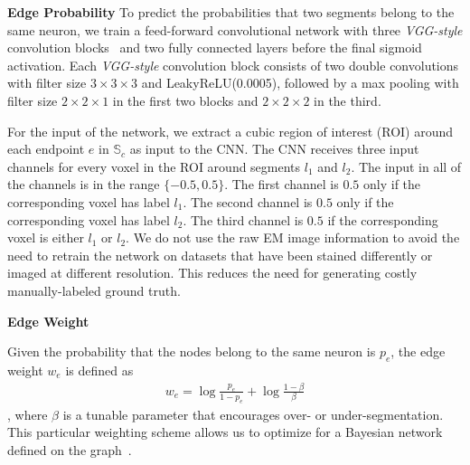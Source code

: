 \noindent\textbf{Edge Probability}
To predict the probabilities that two segments belong to the same neuron, we train a feed-forward convolutional network with three \textit{VGG-style} convolution blocks~\cite{chatfield2014return} and two fully connected layers before the final sigmoid activation. 
Each \textit{VGG-style} convolution block consists of two double convolutions with filter size $3\times3\times3$ and LeakyReLU(0.0005), followed by a max pooling with filter size $2\times2\times1$ in the first two blocks and $2\times2\times2$ in the third. 

For the input of the network, we extract a cubic region of interest (ROI) around each endpoint $e$ in $\mathbb{S}_c$ as input to the CNN. 
The CNN receives three input channels for every voxel in the ROI around segments $l_1$ and $l_2$. 
The input in all of the channels is in the range $\{-0.5, 0.5\}$. 
The first channel is $0.5$ only if the corresponding voxel has label $l_1$. 
The second channel is $0.5$ only if the corresponding voxel has label $l_2$. 
The third channel is $0.5$ if the corresponding voxel is either $l_1$ or $l_2$.
We do not use the raw EM image information to avoid the need to retrain the network on datasets that have been stained differently or imaged at different resolution. 
This reduces the need for generating costly manually-labeled ground truth. 

\noindent\textbf{Edge Weight}

Given the probability that the nodes belong to the same neuron is $p_e$, the edge weight $w_e$ is defined as
\begin{align}
w_e = \log{\frac{p_e}{1 - p_e}} + \log{\frac{1 - \beta}{\beta}}
\end{align}
, where $\beta$ is a tunable parameter that encourages over- or under-segmentation. 
This particular weighting scheme allows us to optimize for a Bayesian network defined on the graph~\cite{keuper2015efficient,andres2011probabilistic}.



